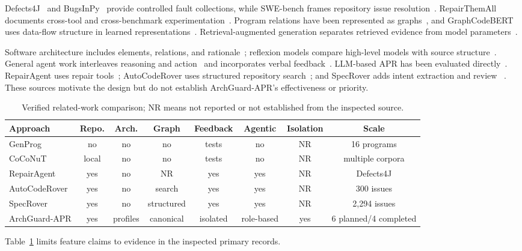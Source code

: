 \documentclass[10pt,journal]{IEEEtran}
\begin{document}
Defects4J~\cite{Just2014Defects4J} and BugsInPy~\cite{Widyasari2020BugsInPy} provide controlled fault
collections, while SWE-bench frames repository issue resolution~\cite{Jimenez2024SWEBench}.
RepairThemAll documents cross-tool and cross-benchmark experimentation~\cite{Durieux2019RepairThemAll}.
Program relations have been represented as graphs~\cite{Allamanis2018Graphs}, and GraphCodeBERT uses
data-flow structure in learned representations~\cite{Guo2021GraphCodeBERT}. Retrieval-augmented
generation separates retrieved evidence from model parameters~\cite{Lewis2020RAG}.

Software architecture includes elements, relations, and rationale~\cite{Perry1992Foundations};
reflexion models compare high-level models with source structure~\cite{Murphy1995Reflexion}.
General agent work interleaves reasoning and action~\cite{Yao2023ReAct} and incorporates verbal
feedback~\cite{Shinn2023Reflexion}. LLM-based APR has been evaluated directly~\cite{Xia2023LLMRepair}.
RepairAgent uses repair tools~\cite{Bouzenia2024RepairAgent}; AutoCodeRover uses structured repository
search~\cite{Zhang2024AutoCodeRover}; and SpecRover adds intent extraction and review
~\cite{Ruan2024SpecRover}. These sources motivate the design but do not establish ArchGuard-APR's
effectiveness or priority.

\begin{table}[t]
\caption{Verified related-work comparison; NR means not reported or not established from the inspected source.}
\label{tab:related-work}\centering\small
\begin{tabular}{lccccccc}\toprule
Approach & Repo. & Arch. & Graph & Feedback & Agentic & Isolation & Scale \\\midrule
GenProg & no & no & no & tests & no & NR & 16 programs \\
CoCoNuT & local & no & no & tests & no & NR & multiple corpora \\
RepairAgent & yes & no & NR & yes & yes & NR & Defects4J \\
AutoCodeRover & yes & no & search & yes & yes & NR & 300 issues \\
SpecRover & yes & no & structured & yes & yes & NR & 2,294 issues \\
ArchGuard-APR & yes & profiles & canonical & isolated & role-based & yes & 6 planned/4 completed \\
\bottomrule\end{tabular}
\end{table}
Table~\ref{tab:related-work} limits feature claims to evidence in the inspected primary records.
\end{document}
